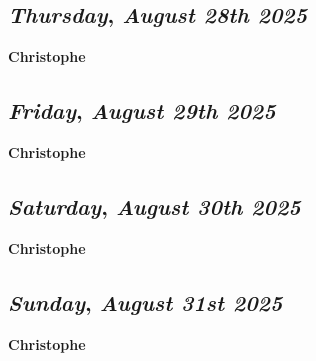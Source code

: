 \def\day{\textit{August 28th 2025}}
\def\weekday{\textit{Thursday}}
\subsection*{\weekday, \day}
\textbf {Christophe}

\def\day{\textit{August 29th 2025}}
\def\weekday{\textit{Friday}}
\subsection*{\weekday, \day}
\textbf {Christophe}

\def\day{\textit{August 30th 2025}}
\def\weekday{\textit{Saturday}}
\subsection*{\weekday, \day}
\textbf {Christophe}

\def\day{\textit{August 31st 2025}}
\def\weekday{\textit{Sunday}}
\subsection*{\weekday, \day}
\textbf {Christophe}
